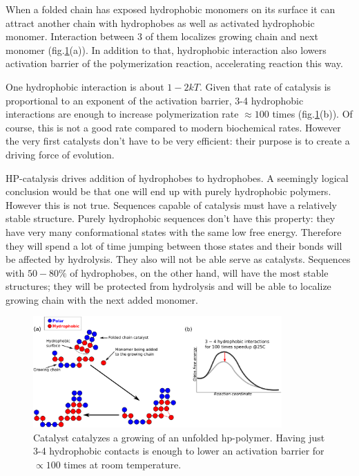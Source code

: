 \documentclass[12pt]{paper}
\begin{document}
When a folded chain has exposed hydrophobic monomers on its surface it can attract another chain 
with hydrophobes as well as activated hydrophobic monomer. Interaction between 3 of them localizes 
growing chain and next monomer (fig.\ref{fig:hp-catalysis}(a)). In addition to that, hydrophobic 
interaction also lowers activation barrier of the polymerization reaction, accelerating reaction 
this way.

One hydrophobic interaction is about $1-2kT$. Given that rate of catalysis is proportional to an 
exponent of the activation barrier, 3-4 hydrophobic interactions are enough to increase 
polymerization rate $\approx 100$ times (fig.\ref{fig:hp-catalysis}(b)). 
Of course, this is not a good rate compared to modern biochemical rates. However the very 
first catalysts don't have to be very efficient: their purpose is to create a driving force of 
evolution.

HP-catalysis drives addition of hydrophobes to hydrophobes. A seemingly logical conclusion would 
be that one will end up with purely hydrophobic polymers. However this is not true. Sequences 
capable of catalysis must have a relatively stable structure. Purely hydrophobic sequences don't 
have this property: they have very many conformational states with the same low free energy. 
Therefore they will spend a lot of time jumping between those states and their bonds will be 
affected by hydrolysis. They also will not be able serve as catalysts. Sequences with $50-80\%$ 
of hydrophobes, on the other hand, will have the most stable structures; they will 
be protected from hydrolysis and will be able to localize growing chain with the next added 
monomer.
\begin{figure}[h!]
  \centering
  \includegraphics[width=0.85\textwidth]{pictures/hp-catalysis.pdf} 
  \caption{Catalyst catalyzes a growing of an unfolded hp-polymer. 
           Having just 3-4 hydrophobic contacts is enough to lower an 
           activation barrier for $\propto 100$ times at room 
           temperature.}
  \label{fig:hp-catalysis}
\end{figure}
\end{document}
